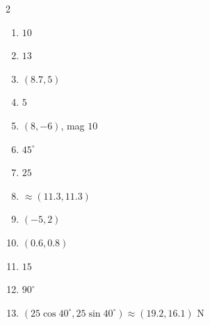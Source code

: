 \documentclass[11pt]{article}
\begin{document}
\begin{keybox}
\begin{multicols}{2}
\small
\begin{enumerate}[leftmargin=*,itemsep=3pt]
  \item $10$
  \item $13$
  \item $(8.7,5)$
  \item $5$
  \item $(8,-6)$, mag $10$
  \item $45^\circ$
  \item $25$
  \item $\approx(11.3,11.3)$
  \item $(-5,2)$
  \item $(0.6,0.8)$
  \item $15$
  \item $90^\circ$
  \item $(25\cos40^\circ,25\sin40^\circ)\approx(19.2,16.1)$ N
\end{enumerate}
\end{multicols}
\end{keybox}
\end{document}
